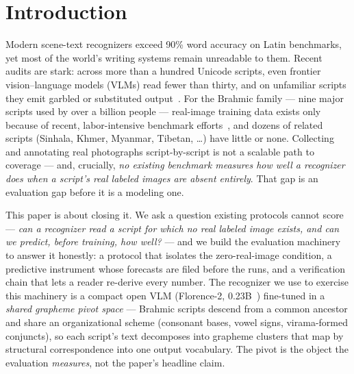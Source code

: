 \section{Introduction}
\label{sec:intro}

Modern scene-text recognizers exceed 90\% word accuracy on Latin benchmarks, yet most of the
world's writing systems remain unreadable to them. Recent audits are stark: across more than a
hundred Unicode scripts, even frontier vision--language models (VLMs) read fewer than thirty, and
on unfamiliar scripts they emit garbled or substituted output~\cite{glotocr}. For the Brahmic
family --- nine major scripts used by over a billion people --- real-image training data exists
only because of recent, labor-intensive benchmark efforts~\cite{indicstr12,bstd}, and dozens of
related scripts (Sinhala, Khmer, Myanmar, Tibetan, \dots) have little or none. Collecting and
annotating real photographs script-by-script is not a scalable path to coverage --- and, crucially,
\emph{no existing benchmark measures how well a recognizer does when a script's real labeled images
are absent entirely}. That gap is an evaluation gap before it is a modeling one.

This paper is about closing it. We ask a question existing protocols cannot score --- \emph{can a
recognizer read a script for which no real labeled image exists, and can we predict, before
training, how well?} --- and we build the evaluation machinery to answer it honestly: a protocol
that isolates the zero-real-image condition, a predictive instrument whose forecasts are filed
before the runs, and a verification chain that lets a reader re-derive every number. The recognizer
we use to exercise this machinery is a compact open VLM (Florence-2, 0.23B~\cite{florence2})
fine-tuned in a \emph{shared grapheme pivot space} --- Brahmic scripts descend from a common
ancestor and share an organizational scheme (consonant bases, vowel signs, virama-formed
conjuncts), so each script's text decomposes into grapheme clusters that map by structural
correspondence into one output vocabulary. The pivot is the object the evaluation \emph{measures},
not the paper's headline claim.

